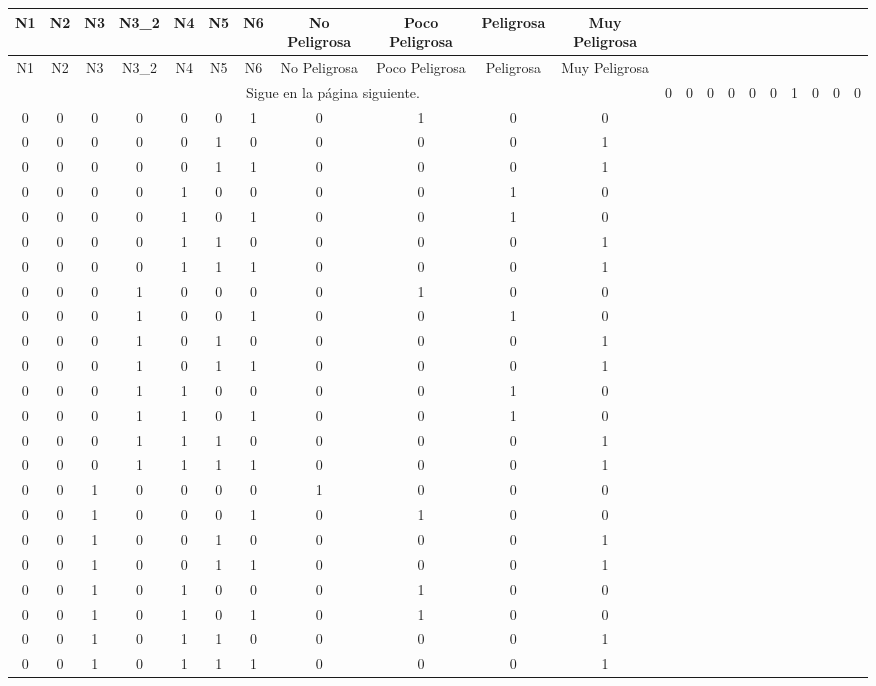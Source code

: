 \begin{longtable}{|c|c|c|c|c|c|c|c|c|c|c|}

\hline
N1 & N2 & N3 & N3\_2 & N4 & N5 & N6 & No Peligrosa & Poco Peligrosa & Peligrosa & Muy Peligrosa \\
\hline
\endfirsthead


\hline
N1 & N2 & N3 & N3\_2 &  N4 & N5 & N6 & No Peligrosa & Poco Peligrosa & Peligrosa & Muy Peligrosa \\
\hline
\endhead
\hline
\multicolumn{11}{c}{Sigue en la p\'agina siguiente.}
\endfoot
\endlastfoot


0 & 0 & 0 & 0 & 0 & 0 & 0 &  1 & 0 & 0 & 0 \\
0 & 0 & 0 & 0 & 0 & 0 & 1 &  0 & 1 & 0 & 0 \\
0 & 0 & 0 & 0 & 0 & 1 & 0 &  0 & 0 & 0 & 1 \\
0 & 0 & 0 & 0 & 0 & 1 & 1 &  0 & 0 & 0 & 1 \\
0 & 0 & 0 & 0 & 1 & 0 & 0 &  0 & 0 & 1 & 0 \\
0 & 0 & 0 & 0 & 1 & 0 & 1 &  0 & 0 & 1 & 0 \\
0 & 0 & 0 & 0 & 1 & 1 & 0 &  0 & 0 & 0 & 1 \\
0 & 0 & 0 & 0 & 1 & 1 & 1 &  0 & 0 & 0 & 1 \\
0 & 0 & 0 & 1 & 0 & 0 & 0 &  0 & 1 & 0 & 0 \\
0 & 0 & 0 & 1 & 0 & 0 & 1 &  0 & 0 & 1 & 0 \\
0 & 0 & 0 & 1 & 0 & 1 & 0 &  0 & 0 & 0 & 1 \\
0 & 0 & 0 & 1 & 0 & 1 & 1 &  0 & 0 & 0 & 1 \\
0 & 0 & 0 & 1 & 1 & 0 & 0 &  0 & 0 & 1 & 0 \\
0 & 0 & 0 & 1 & 1 & 0 & 1 &  0 & 0 & 1 & 0 \\
0 & 0 & 0 & 1 & 1 & 1 & 0 &  0 & 0 & 0 & 1 \\
0 & 0 & 0 & 1 & 1 & 1 & 1 &  0 & 0 & 0 & 1 \\
0 & 0 & 1 & 0 & 0 & 0 & 0 &  1 & 0 & 0 & 0 \\
0 & 0 & 1 & 0 & 0 & 0 & 1 &  0 & 1 & 0 & 0 \\
0 & 0 & 1 & 0 & 0 & 1 & 0 &  0 & 0 & 0 & 1 \\
0 & 0 & 1 & 0 & 0 & 1 & 1 &  0 & 0 & 0 & 1 \\
0 & 0 & 1 & 0 & 1 & 0 & 0 &  0 & 1 & 0 & 0 \\
0 & 0 & 1 & 0 & 1 & 0 & 1 &  0 & 1 & 0 & 0 \\
0 & 0 & 1 & 0 & 1 & 1 & 0 &  0 & 0 & 0 & 1 \\
0 & 0 & 1 & 0 & 1 & 1 & 1 &  0 & 0 & 0 & 1 \\

\end{longtable}
